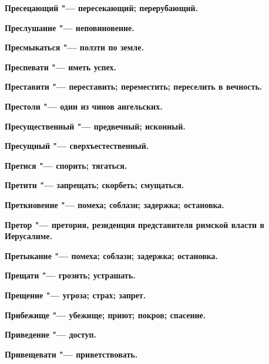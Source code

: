 \begin{mymulticols}{2}
\bfseries Пресецающий\normalfont{} "--- пересекающий; перерубающий. 




\bfseries Преслушание\normalfont{} "--- неповиновение. 




\bfseries Пресмыкаться\normalfont{} "--- ползти по земле. 




\bfseries Преспевати\normalfont{} "--- иметь успех. 




\bfseries Преставити\normalfont{} "--- переставить; переместить; переселить в вечность. 




\bfseries Престоли\normalfont{} "--- один из чинов ангельских. 




\bfseries Пресущественный\normalfont{} "--- предвечный; исконный. 




\bfseries Пресущный\normalfont{} "--- сверхъестественный. 




\bfseries Претися\normalfont{} "--- спорить; тягаться. 




\bfseries Претити\normalfont{} "--- запрещать; скорбеть; смущаться. 




\bfseries Преткновение\normalfont{} "--- помеха; соблазн; задержка; остановка. 




\bfseries Претор\normalfont{} "--- претория, резиденция представителя римской власти в Иерусалиме. 




\bfseries Претыкание\normalfont{} "--- помеха; соблазн; задержка; остановка. 




\bfseries Прещати\normalfont{} "--- грозить; устрашать. 




\bfseries Прещение\normalfont{} "--- угроза; страх; запрет. 




\bfseries Прибежище\normalfont{} "--- убежище; приют; покров; спасение. 




\bfseries Приведение\normalfont{} "--- доступ. 




\bfseries Привещевати\normalfont{} "--- приветствовать. 





\end{mymulticols}
